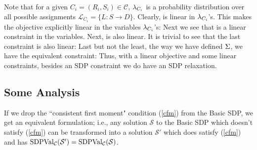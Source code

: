 Note that for a given $C_i =(R_i, S_i) \in \mathcal{C}$, $\lambda_{C_i}$ is a probability distribution over all possible assignments $\mathcal{L}_{C_i} = \{L: S \rightarrow D\}$. Clearly,  
is linear in $\lambda_{C_i}$'s.
This makes the objective explicitly linear in the variables $\lambda_{C_i}$'s:
Next we see that 
is a linear constraint in the variables. Next, 
is also linear. 
It is trivial to see that the last constraint is also linear:
Last but not the least, the way we have defined $\Sigma$, we have the equivalent constraint:
Thus, with a linear objective and some linear constraints, besides an SDP constraint we do have an SDP relaxation.

\subsection{Some Analysis}
\begin{remark}\label{remark01}
If we drop the ``consistent first moment" condition (\ref{cfm}) from the Basic SDP, we get
an equivalent formulation; i.e., any solution $\mathcal{S}$ to the Basic SDP which doesn't satisfy  (\ref{cfm}) can be transformed into a solution $\mathcal{S}'$ which does satisfy  (\ref{cfm}) and has $\mbox{SDPVal}_{\mathcal{C}}(\mathcal{S}')
= \mbox{SDPVal}_{\mathcal{C}} (\mathcal{S})$.
\end{remark}

